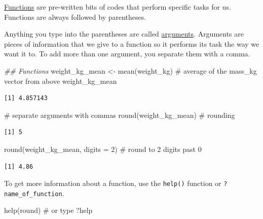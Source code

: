 \documentclass[
  letterpaper,
  DIV=11,
  numbers=noendperiod]{scrartcl}
\newenvironment{Shaded}{\begin{snugshade}}{\end{snugshade}}
\newcommand{\AttributeTok}[1]{\textcolor[rgb]{0.40,0.45,0.13}{#1}}
\newcommand{\CommentTok}[1]{\textcolor[rgb]{0.37,0.37,0.37}{#1}}
\newcommand{\DecValTok}[1]{\textcolor[rgb]{0.68,0.00,0.00}{#1}}
\newcommand{\DocumentationTok}[1]{\textcolor[rgb]{0.37,0.37,0.37}{\textit{#1}}}
\newcommand{\FunctionTok}[1]{\textcolor[rgb]{0.28,0.35,0.67}{#1}}
\newcommand{\NormalTok}[1]{\textcolor[rgb]{0.00,0.23,0.31}{#1}}
\newcommand{\OtherTok}[1]{\textcolor[rgb]{0.00,0.23,0.31}{#1}}
\begin{document}
\ul{Functions} are pre-written bits of codes that perform specific tasks
for us. Functions are always followed by parentheses.

Anything you type into the parentheses are called \ul{arguments}.
Arguments are pieces of information that we give to a function so it
performs its task the way we want it to. To add more than one argument,
you separate them with a comma.

\begin{Shaded}
\begin{Highlighting}[]
\DocumentationTok{\#\# Functions}
\NormalTok{weight\_kg\_mean }\OtherTok{\textless{}{-}} \FunctionTok{mean}\NormalTok{(weight\_kg)   }\CommentTok{\# average of the mass\_kg vector from above}
\NormalTok{weight\_kg\_mean}
\end{Highlighting}
\end{Shaded}

\begin{verbatim}
[1] 4.857143
\end{verbatim}

\begin{Shaded}
\begin{Highlighting}[]
\CommentTok{\# separate arguments with commas}
\FunctionTok{round}\NormalTok{(weight\_kg\_mean)             }\CommentTok{\# rounding}
\end{Highlighting}
\end{Shaded}

\begin{verbatim}
[1] 5
\end{verbatim}

\begin{Shaded}
\begin{Highlighting}[]
\FunctionTok{round}\NormalTok{(weight\_kg\_mean, }\AttributeTok{digits =} \DecValTok{2}\NormalTok{) }\CommentTok{\# round to 2 digits past 0}
\end{Highlighting}
\end{Shaded}

\begin{verbatim}
[1] 4.86
\end{verbatim}

To get more information about a function, use the \texttt{help()}
function or \texttt{?name\_of\_function}.

\begin{Shaded}
\begin{Highlighting}[]
\FunctionTok{help}\NormalTok{(round) }\CommentTok{\# or type ?help}
\end{Highlighting}
\end{Shaded}
\end{document}
